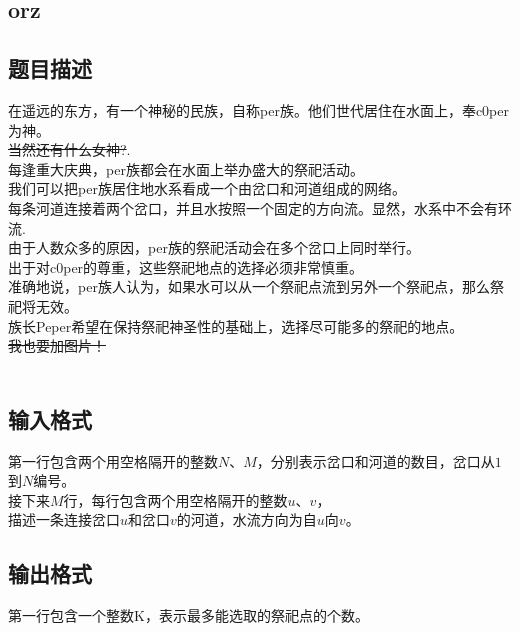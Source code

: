 \documentclass{article}
\begin{document}
\begin{spacing}{1.0}
\section{orz}
\subsection{题目描述}
在遥远的东方，有一个神秘的民族，自称per族。他们世代居住在水面上，奉c0per为神。\\
\sout{当然还有什么女神?}.\\
每逢重大庆典，per族都会在水面上举办盛大的祭祀活动。\\
我们可以把per族居住地水系看成一个由岔口和河道组成的网络。\\
每条河道连接着两个岔口，并且水按照一个固定的方向流。显然，水系中不会有环流.\\
由于人数众多的原因，per族的祭祀活动会在多个岔口上同时举行。\\
出于对c0per的尊重，这些祭祀地点的选择必须非常慎重。\\
准确地说，per族人认为，如果水可以从一个祭祀点流到另外一个祭祀点，那么祭祀将无效。\\
族长Peper希望在保持祭祀神圣性的基础上，选择尽可能多的祭祀的地点。\\
\sout{我也要加图片！}\\
\\
\subsection{输入格式}
第一行包含两个用空格隔开的整数$N$、$M$，分别表示岔口和河道的数目，岔口从$1$到$N$编号。\\
接下来$M$行，每行包含两个用空格隔开的整数$u$、$v$，\\
描述一条连接岔口$u$和岔口$v$的河道，水流方向为自$u$向$v$。\\
\subsection{输出格式}
第一行包含一个整数K，表示最多能选取的祭祀点的个数。\\

\end{spacing}
\end{document}
